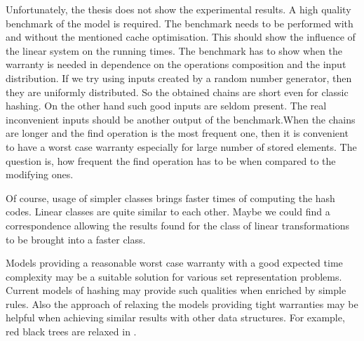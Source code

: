 Unfortunately, the thesis does not show the experimental results. A high quality benchmark of the model is required. The benchmark needs to be performed with and without the mentioned cache optimisation. This should show the influence of the linear system on the running times. The benchmark has to show when the warranty is needed in dependence on the operations composition and the input distribution. If we try using inputs created by a random number generator, then they are uniformly distributed. So the obtained chains are short even for classic hashing. On the other hand such good inputs are seldom present. The real inconvenient inputs should be another output of the benchmark.When the chains are longer and the find operation is the most frequent one, then it is convenient to have a worst case warranty especially for large number of stored elements. The question is, how frequent the find operation has to be when compared to the modifying ones.

Of course, usage of simpler classes brings faster times of computing the hash codes. Linear classes are quite similar to each other. Maybe we could find a correspondence allowing the results found for the class of linear transformations to be brought into a faster class.

Models providing a reasonable worst case warranty with a good expected time complexity may be a suitable solution for various set representation problems. Current models of hashing may provide such qualities when enriched by simple rules. Also the approach of relaxing the models providing tight warranties may be helpful when achieving similar results with other data structures. For example, red black trees are relaxed in \cite{752883} .
